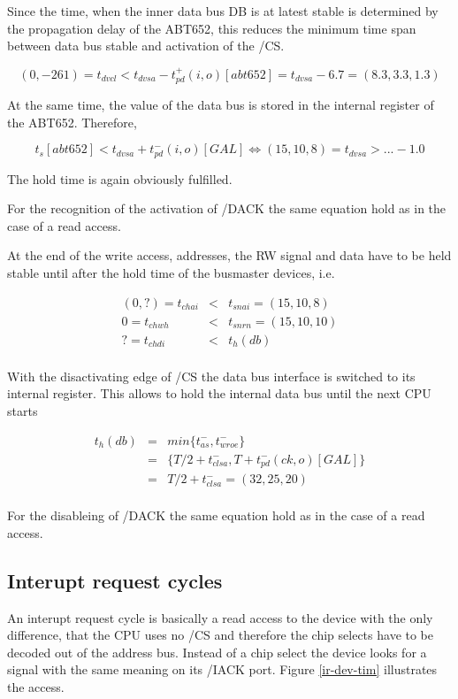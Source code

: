 \documentclass[12pt]{article}
\newcommand{\beqn}{\begin{eqnarray*}}
\newcommand{\eeqn}{\end{eqnarray*}}
\begin{document}
Since the time, when the inner data bus DB is at latest stable is
determined by the propagation delay of the ABT652, this reduces the
minimum time span between data bus stable and activation of the /CS.

\[ (0,-261) = t_{dvcl} < t_{dvsa} - t_{pd}^+(i,o)[abt652] = 
t_{dvsa} - 6.7 = (8.3,3.3,1.3) \]

At the same time, the value of the data bus is stored in the internal
register of the ABT652. Therefore,

\[ t_s[abt652] < t_{dvsa} + t_{pd}^-(i,o)[GAL] \Leftrightarrow
(15,10,8) = t_{dvsa} > ... - 1.0 \]

The hold time is again obviously fulfilled.

For the recognition of the activation of /DACK the same equation hold
as in the case of a read access.

At the end of the write access, addresses, the RW signal and data have
to be held stable until after the hold time of the busmaster devices,
i.e.

\beqn
(0,?) = t_{chai} &<& t_{snai} = (15,10,8)\\
0 = t_{chwh} &<& t_{snrn} = (15,10,10)\\
? = t_{chdi} &<& t_h(db)\\
\eeqn

With the disactivating edge of /CS the data bus interface is switched
to its internal register. This allows to hold the internal data bus
until the next CPU starts

\beqn
t_h(db) &=& min \{ t_{as}^- , t_{wroe}^- \}\\
&=& \{ T/2 + t_{clsa}^- , T + t_{pd}^-(ck,o)[GAL] \}\\
&=& T/2 + t_{clsa}^- = (32,25,20)\\
\eeqn

For the disableing of /DACK the same equation hold as in the case of a
read access.


\subsection{Interupt request cycles}

An interupt request cycle is basically a read access to the device
with the only difference, that the CPU uses no /CS and therefore the
chip selects have to be decoded out of the address
bus. Instead of a chip select the device looks for a signal with
the same meaning on its /IACK port. Figure \ref{ir-dev-tim}
illustrates the access.
\end{document}
